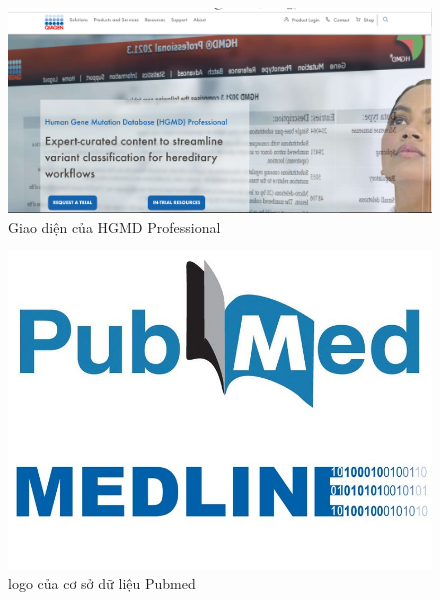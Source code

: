 \documentclass[../DoAn.tex]{subfiles}
\begin{document}
\begin{figure}
\centering
\includegraphics[width=1\linewidth]{Hinh_ve/HGMDpro.png}
\caption{Giao diện của HGMD Professional}
\label{fig:hgmdpro}
\end{figure}


\begin{figure}
\centering
\includegraphics[width=1\linewidth]{Hinh_ve/Pubmed_logologo.png}
\caption{logo của cơ sở dữ liệu Pubmed}
\label{fig:pubmedlogo}
\end{figure}
\end{document}

